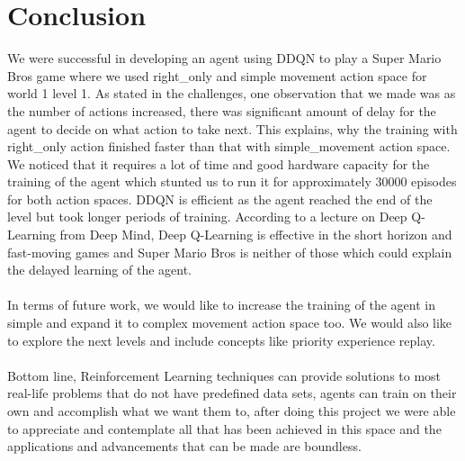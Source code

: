 \documentclass[conference]{IEEEtran}
\theoremstyle{definition}
\begin{document}
\section{Conclusion}
We were successful in developing an agent using DDQN to play a Super Mario Bros game where we used right\_only and simple movement action space for world 1 level 1. As stated in the challenges, one observation that we made was as the number of actions increased, there was significant amount of delay for the agent to decide on what action to take next. This explains, why the training with right\_only action finished faster than that with simple\_movement action space. We noticed that it requires a lot of time and good hardware capacity for the training of the agent which stunted us to run it for approximately 30000 episodes for both action spaces. DDQN is efficient as the agent reached the end of the level but took longer periods of training. According to a lecture on Deep Q-Learning from Deep Mind\cite{deepmind}, Deep Q-Learning is effective in the short horizon and fast-moving games and Super Mario Bros is neither of those which could explain the delayed learning of the agent.
\\
\\
In terms of future work, we would like to increase the training of the agent in simple and expand it to complex movement action space too. We would also like to explore the next levels and include concepts like priority experience replay. 
\\
\\
Bottom line, Reinforcement Learning techniques can provide solutions to most real-life problems that do not have predefined data sets, agents can train on their own and accomplish what we want them to, after doing this project we were able to appreciate and contemplate all that has been achieved in this space and the applications and advancements that can be made are boundless.



\end{document}
